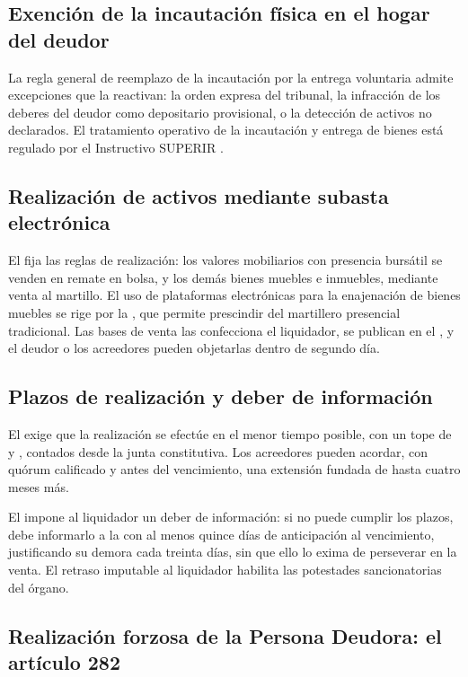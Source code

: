 \subsection{Exención de la incautación física en el hogar del deudor}

La regla general de reemplazo de la incautación por la entrega voluntaria admite
excepciones que la reactivan: la orden expresa del tribunal, la infracción de los deberes
del deudor como depositario provisional, o la detección de activos no declarados. El
tratamiento operativo de la incautación y entrega de bienes está regulado por el
Instructivo SUPERIR  \parencite{instructivo-i5}.

\subsection{Realización de activos mediante subasta electrónica}

El  fija las reglas de realización: los valores mobiliarios con presencia bursátil
se venden en remate en bolsa, y los demás bienes muebles e inmuebles, mediante venta al
martillo. El uso de plataformas electrónicas para la enajenación de bienes muebles se rige
por la  \citeyearpar{ncg-25}, que permite prescindir del martillero presencial
tradicional. Las bases de venta las confecciona el liquidador, se publican en el
\boletin{}, y el deudor o los acreedores pueden objetarlas dentro de segundo día.

\subsection{Plazos de realización y deber de información}

El  exige que la realización se efectúe en el menor tiempo posible, con un tope de
 y ,
contados desde la junta constitutiva. Los acreedores pueden acordar, con quórum calificado y
antes del vencimiento, una extensión fundada de hasta cuatro meses más.

El  impone al liquidador un deber de información: si no puede cumplir los plazos,
debe informarlo a la \superir{} con al menos quince días de anticipación al vencimiento,
justificando su demora cada treinta días, sin que ello lo exima de perseverar en la venta.
El retraso imputable al liquidador habilita las potestades sancionatorias del órgano.

\subsection{Realización forzosa de la Persona Deudora: el artículo 282}

